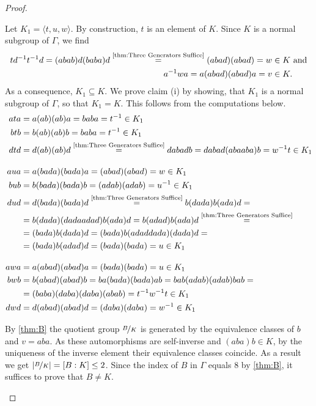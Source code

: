 \begin{proof}
\begin{plist}
\item Let $K_1=\langle t,u,w\rangle$. By construction, $t$ is an element of $K$. Since $K$ is a normal subgroup of $\Gamma$, we find
\begin{align*}
td^{-1}t^{-1}d=(abab)d(baba)d\overset{\text{\cref{thm:Three Generators Suffice}}}{=}(abad)(abad)=w&\in K\text{ and}\\
a^{-1}wa=a(abad)(abad)a=v&\in K.
\end{align*}
As a consequence, $K_1\subseteq K$. We prove claim (i) by showing, that $K_1$ is a normal subgroup of $\Gamma$, so that $K_1=K$. This follows from the computations below.
\begin{align*}
ata	&=a(ab)(ab)a=baba=t^{-1}\in K_1\\
btb	&=b(ab)(ab)b=baba=t^{-1}\in K_1\\
dtd	&=d(ab)(ab)d\overset{\text{\cref{thm:Three Generators Suffice}}}{=}dabadb=dabad(abaaba)b=w^{-1}t\in K_1\\[1em]
aua	&=a(bada)(bada)a=(abad)(abad)=w\in K_1\\
bub	&=b(bada)(bada)b=(adab)(adab)=u^{-1}\in K_1\\
dud	&=d(bada)(bada)d\overset{\text{\cref{thm:Three Generators Suffice}}}{=}b(dada)b(ada)d=\\
	&=b(dada)(dadaadad)b(ada)d=b(adad)b(ada)d\overset{\text{\cref{thm:Three Generators Suffice}}}{=}\\
	&=(bada)b(dada)d=(bada)b(adaddada)(dada)d=\\
	&=(bada)b(adad)d=(bada)(bada)=u\in K_1\\[1em]
awa	&=a(abad)(abad)a=(bada)(bada)=u\in K_1\\
bwb	&=b(abad)(abad)b=ba(bada)(bada)ab=bab(adab)(adab)bab=\\
	&=(baba)(daba)(daba)(abab)=t^{-1}w^{-1}t\in K_1\\
dwd	&=d(abad)(abad)d=(daba)(daba)=w^{-1}\in K_1
\end{align*}
\item\label{p:Index of K in Gamma} By \cref{thm:B} the quotient group $\nicefrac{B}{K}$ is generated by the equivalence classes of $b$ and $v=aba$. As these automorphisms are self-inverse and $(aba)b\in K$, by the uniqueness of the inverse element their equivalence classes  coincide. As a result we get $\lvert\nicefrac{B}{K}\rvert=[B:K]\leq 2$. Since the index of $B$ in $\Gamma$ equals 8 by \cref{thm:B}, it suffices to prove that $B\neq K$.\\

\end{plist}
\end{proof}
